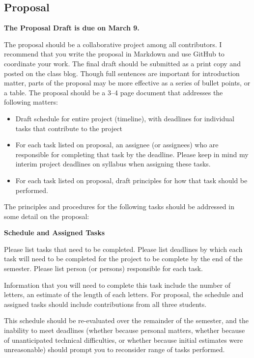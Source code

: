 \documentclass[9pt,oneside,notitlepageletterpaperopenright]{article}
\begin{document}
\subsection*{Proposal}\label{proposal}

\textbf{The Proposal Draft is due on March 9.}

The proposal should be a collaborative project among all contributors. I
recommend that you write the proposal in Markdown and use GitHub to
coordinate your work. The final draft should be submitted as a print
copy and posted on the class blog. Though full sentences are important
for introduction matter, parts of the proposal may be more effective as
a series of bullet points, or a table. The proposal should be a 3--4
page document that addresses the following matters:

\begin{itemize}
\itemsep1pt\parskip0pt
\item
  Draft schedule for entire project (timeline), with deadlines for
  individual tasks that contribute to the project
\item
  For each task listed on proposal, an assignee (or assignees) who are
  responsible for completing that task by the deadline. Please keep in
  mind my interim project deadlines on syllabus when assigning these
  tasks.
\item
  For each task listed on proposal, draft principles for how that task
  should be performed.
\end{itemize}

The principles and procedures for the following tasks should be
addressed in some detail on the proposal:

\textbf{Schedule and Assigned Tasks}

Please list tasks that need to be completed. Please list deadlines by
which each task will need to be completed for the project to be complete
by the end of the semester. Please list person (or persons) responsible
for each task.

Information that you will need to complete this task include the number
of letters, an estimate of the length of each letters. For proposal, the
schedule and assigned tasks should include contributions from all three
students.

This schedule should be re-evaluated over the remainder of the semester,
and the inability to meet deadlines (whether because personal matters,
whether because of unanticipated technical difficulties, or whether
because initial estimates were unreasonable) should prompt you to
reconsider range of tasks performed.
\end{document}
